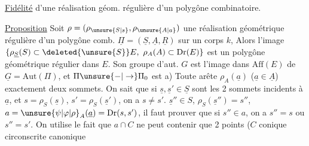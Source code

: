 \uline{Fidélité} d'une réalisation géom. régulière d'un polygône combinatoire.

\uline{Proposition} Soit $\rho=(\rho_{\unsure{S|s}},\rho_{\unsure{A|a}})$ une réalisation géométrique régulière d'un polygône comb. $\underline{\Pi}=(\underline S,\underline A,\underline R)$ sur un corps $k$,  Alors l'image $\{\rho_{\underline S}(S)\subset\deleted{\unsure{S}}E,\ \rho_A(A)\subset\mathrm{Dr}(E)\}$ est un polygône géométrique  régulier dans $E$.
Son groupe d'aut. $G$ est l'image dans $\mathrm{Aff}(E)$ de $\underline G=\mathrm{Aut}(\Pi)$, et $\Pi\unsure{-|\to}\Pi_0$ est 
a) Toute arête $\rho_A(\underline a)$ ($\underline a\in\underline A$)  exactement deux sommets. On sait que si $\underline s,\underline{s}'\in\underline S$ sont les 2 sommets incidents à $\underline a$, et $s=\rho_S(\underline s)$, $s'=\rho_S(\underline{s}')$, on a $s\ne s'$.
  $\underline{s}''\in S$,  $\rho_S(\underline{s}'')=s''$,  $a=\unsure{\psi|\varphi|\rho}_A(\underline a)=\mathrm{Dr}(s,s')$, il faut prouver que si $s''\in a$, on a $s''=s$ ou $s''=s'$. On utilise le fait que $a\cap C$ ne peut contenir que 2 points ($C$ conique circonscrite canonique \unsure{\dots)|\dots}
